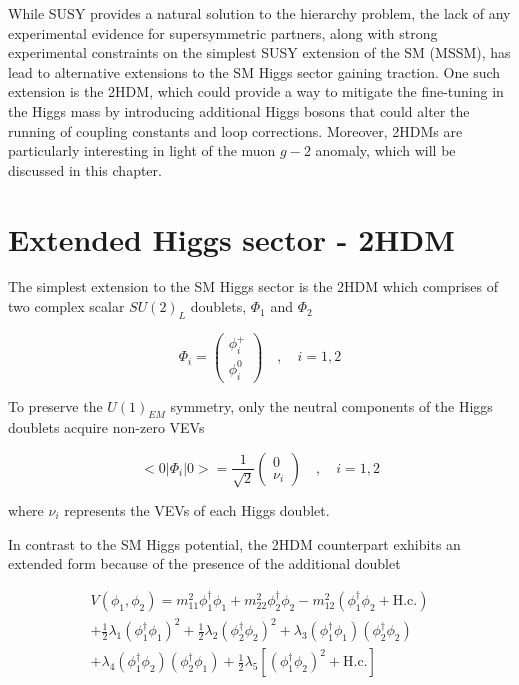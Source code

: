 While SUSY provides a natural solution to the hierarchy problem, the lack of any experimental evidence for supersymmetric partners, along with strong experimental constraints on the simplest SUSY extension of the SM (MSSM), has lead to alternative extensions to the SM Higgs sector gaining traction. One such extension is the \ac{2HDM}, which could provide a way to mitigate the fine-tuning in the Higgs mass by introducing additional Higgs bosons that could alter the running of coupling constants and loop corrections. Moreover, 2HDMs are particularly interesting in light of the muon $g-2$ anomaly, which will be discussed in this chapter.

\section{Extended Higgs sector - 2HDM}

The simplest extension to the SM Higgs sector is the 2HDM which comprises of two complex scalar $SU(2)_L$ doublets, $\Phi_1$ and $\Phi_2$

\begin{equation}
\Phi_i =
\begin{pmatrix}
\phi_i^{+} \\
\phi_i^{0} 
\end{pmatrix}
\quad ,\quad i = 1,2
\end{equation}

To preserve the $U(1)_{EM}$ symmetry, only the neutral components of the Higgs doublets acquire non-zero VEVs

\begin{equation}
    <0|\Phi_i|0> = \frac{1}{\sqrt{2}} \begin{pmatrix}
        0 \\
        \nu_i
    \end{pmatrix} \quad,\quad i=1,2
\end{equation}

where $\nu_i$ represents the VEVs of each Higgs doublet.

In contrast to the SM Higgs potential, the 2HDM counterpart exhibits an extended form because of the presence of the additional doublet

\begin{equation}
\begin{array}{c}
    V(\phi_1,\phi_2) = m_{11}^2 \phi_1^{\dagger}\phi_1 + m_{22}^2 \phi_2^{\dagger}\phi_2 - m_{12}^2(\phi_1^\dagger\phi_2 + \text{H.c.}) \\
    + \frac{1}{2} \lambda_1(\phi_1^\dagger\phi_1)^2 + \frac{1}{2}\lambda_2(\phi_2^\dagger\phi_2)^2 + \lambda_3(\phi_1^\dagger\phi_1)(\phi_2^\dagger\phi_2) \\
    + \lambda_4(\phi_1^\dagger\phi_2)(\phi_2^\dagger\phi_1) + \frac{1}{2}\lambda_5[(\phi_1^\dagger\phi_2)^2 + \text{H.c.}] \\
\end{array}
\end{equation}

